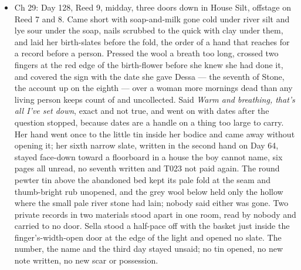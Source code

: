 \documentclass{design/chronicle}
\begin{document}
{\begin{itemize}[leftmargin=1.4em,itemsep=1pt,topsep=3pt,parsep=0pt]
\item Ch 29: Day 128, Reed 9, midday, three doors down in House Silt, offstage on Reed 7 and 8. Came short with soap-and-milk gone cold under river silt and lye sour under the soap, nails scrubbed to the quick with clay under them, and laid her birth-slates before the fold, the order of a hand that reaches for a record before a person. Pressed the wool a breath too long, crossed two fingers at the red edge of the birth-flower before she knew she had done it, and covered the sign with the date she gave Dessa — the seventh of Stone, the account up on the eighth — over a woman more mornings dead than any living person keeps count of and uncollected. Said \emph{Warm and breathing, that’s all I’ve set down}, exact and not true, and went on with dates after the question stopped, because dates are a handle on a thing too large to carry. Her hand went once to the little tin inside her bodice and came away without opening it; her sixth narrow slate, written in the second hand on Day 64, stayed face-down toward a floorboard in a house the boy cannot name, six pages all unread, no seventh written and T023 not paid again. The round pewter tin above the abandoned bed kept its pale fold at the seam and thumb-bright rub unopened, and the grey wool below held only the hollow where the small pale river stone had lain; nobody said either was gone. Two private records in two materials stood apart in one room, read by nobody and carried to no door. Sella stood a half-pace off with the basket just inside the finger’s-width-open door at the edge of the light and opened no slate. The number, the name and the third day stayed unsaid; no tin opened, no new note written, no new scar or possession.

\end{itemize}
}
\end{document}
